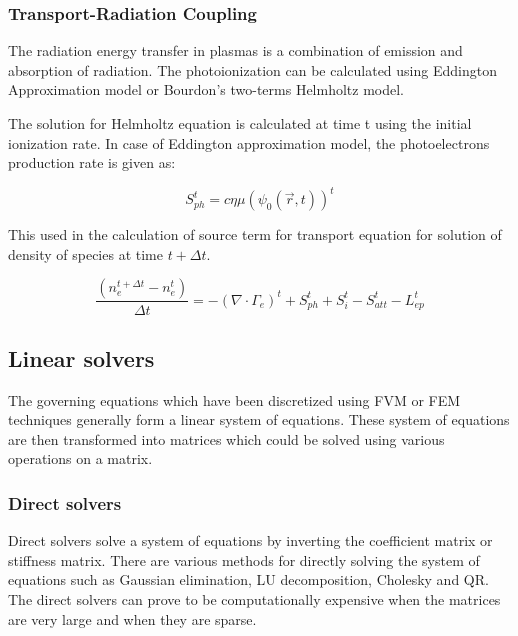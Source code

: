 \documentclass[paper=a4, fontsize=13pt]{scrartcl}
\begin{document}
\subsubsection{Transport-Radiation Coupling}

The radiation energy transfer in plasmas is a combination of emission and absorption of radiation. The photoionization can be calculated using Eddington Approximation model or Bourdon's two-terms Helmholtz model. 


The solution for Helmholtz equation is calculated at time t using the initial ionization rate. In case of Eddington approximation model, the photoelectrons production rate is given as:


\begin{equation}
S_{ph}^t = c \eta \mu (\psi_0 (\vec{r},t))^t 
\end{equation}

This used in the calculation of source term for transport equation for solution of density of species at time $t + \Delta t$.


\begin{equation}
\frac{(n_e^{t+\Delta t} - n_e^t)}{\Delta t} = -(\nabla \cdot \Gamma_e)^t + S_{ph}^t + S_i^t - S_{att}^t - L_{ep}^t 
\end{equation}

   
\subsection{Linear solvers}

The governing equations which have been discretized using FVM or FEM techniques generally form a linear system of equations. These system of equations are then transformed into matrices which could be solved using various operations on a matrix. 

\subsubsection{Direct solvers}

Direct solvers solve a system of equations by inverting the coefficient matrix or stiffness matrix. There are various methods for directly solving the system of equations such as Gaussian elimination, LU decomposition, Cholesky and QR. The direct solvers can prove to be computationally expensive when the matrices are very large and when they are sparse.
\end{document}
